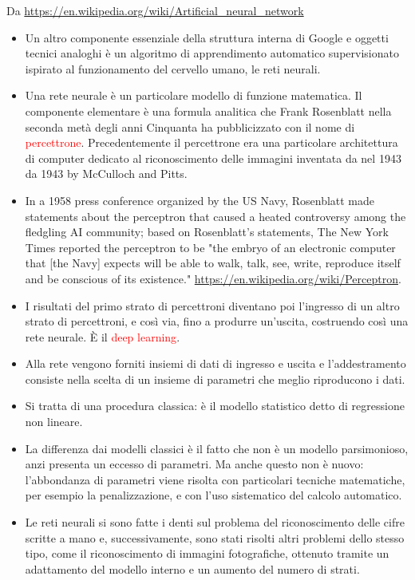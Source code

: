 \documentclass[xcolor=svgnames]{beamer}
\newcommand{\rosso}[1]{\textcolor{red}{#1}}
\renewcommand{\emph}{\rosso}
\begin{document}
\begin{frame}
  {\tiny Da \url{https://en.wikipedia.org/wiki/Artificial_neural_network}}
  \begin{itemize}
    \item 
      Un altro componente essenziale della struttura interna di Google e oggetti tecnici analoghi è un algoritmo di apprendimento automatico supervisionato ispirato al funzionamento del cervello umano, le reti neurali.
    \item Una rete neurale è un particolare modello di funzione matematica. Il componente elementare è una formula analitica che Frank Rosenblatt nella seconda metà degli anni Cinquanta ha pubblicizzato con il nome di \emph{percettrone}. Precedentemente il percettrone era una particolare architettura di computer dedicato al riconoscimento delle immagini inventata da nel 1943 da 1943 by McCulloch and Pitts.
\item In a 1958 press conference organized by the US Navy, Rosenblatt made statements about the perceptron that caused a heated controversy among the fledgling AI community; based on Rosenblatt's statements, The New York Times reported the perceptron to be "the embryo of an electronic computer that [the Navy] expects will be able to walk, talk, see, write, reproduce itself and be conscious of its existence." {\tiny \url{https://en.wikipedia.org/wiki/Perceptron}}.
    \item I risultati del primo strato di percettroni diventano poi l'ingresso di un altro strato di percettroni, e così via, fino a produrre un'uscita, costruendo così una rete neurale. \`E il \emph{deep learning}.
      \item Alla rete vengono forniti insiemi di dati di ingresso e uscita e l'addestramento consiste nella scelta di un insieme di parametri che meglio riproducono i dati.
\item Si tratta di una procedura classica: è il modello statistico detto di regressione non lineare.
  \item La differenza dai modelli classici è il fatto che non è un modello parsimonioso, anzi presenta un eccesso di parametri. Ma anche questo non è nuovo: l'abbondanza di parametri viene risolta con particolari tecniche matematiche, per esempio la penalizzazione, e con l'uso sistematico del calcolo automatico.
\item 
  Le reti neurali si sono fatte i denti sul problema del riconoscimento delle cifre scritte a mano e, successivamente, sono stati risolti altri problemi dello stesso tipo, come il riconoscimento di immagini fotografiche, ottenuto tramite un adattamento del modello interno e un aumento del numero di strati.
\end{itemize}

\end{frame}
\end{document}
